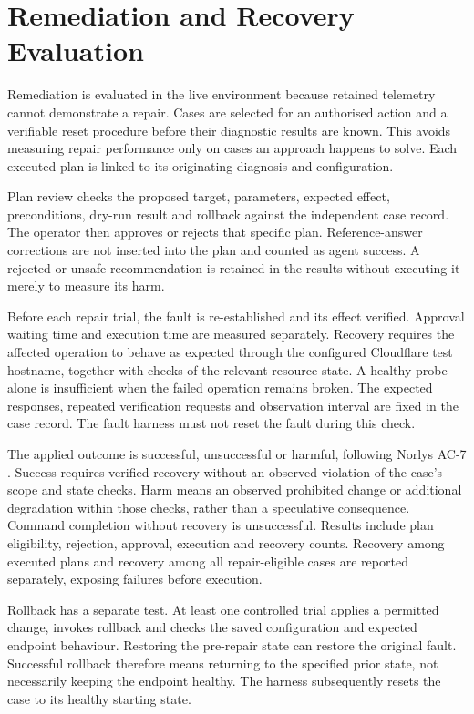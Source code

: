 \section{Remediation and Recovery Evaluation}
\label{sec:methodology:remediation}

Remediation is evaluated in the live environment because retained
telemetry cannot demonstrate a repair. Cases are selected for an
authorised action and a verifiable reset procedure before their
diagnostic results are known. This avoids measuring repair performance
only on cases an approach happens to solve. Each executed plan is linked
to its originating diagnosis and configuration.

Plan review checks the proposed target, parameters, expected effect,
preconditions, dry-run result and rollback against the independent case
record. The operator then approves or rejects that specific plan.
Reference-answer corrections are not inserted into the plan and counted
as agent success. A rejected or unsafe recommendation is retained in the
results without executing it merely to measure its harm.

Before each repair trial, the fault is re-established and its effect
verified. Approval waiting time and execution time are measured separately.
Recovery requires the affected operation to behave as expected through
the configured Cloudflare test hostname, together with checks of the relevant
resource state. A healthy probe alone is insufficient when the failed
operation remains broken. The expected responses, repeated verification
requests and observation interval are fixed in the case record. The
fault harness must not reset the fault during this check.

The applied outcome is successful, unsuccessful or harmful, following
Norlys AC-7 \parencite[AC-7]{norlys_operations_agents}. Success requires
verified recovery without an observed violation of the case's scope and
state checks. Harm means an observed prohibited change or additional
degradation within those checks, rather than a speculative consequence.
Command completion without recovery is unsuccessful. Results include
plan eligibility, rejection, approval, execution and recovery counts.
Recovery among executed plans and recovery among all repair-eligible cases
are reported separately, exposing failures before execution.

Rollback has a separate test. At least one controlled trial applies a
permitted change, invokes rollback and checks the saved configuration and
expected endpoint behaviour. Restoring the pre-repair state can restore
the original fault. Successful rollback therefore means returning to the
specified prior state, not necessarily keeping the endpoint healthy.
The harness subsequently resets the case to its healthy starting state.

